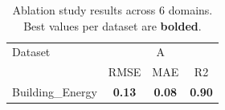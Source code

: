 \begin{table}[t]
\centering
\caption{Ablation study results across 6 domains. Best values per dataset are \textbf{bolded}.}
\label{tab:ablation}
\begin{tabular}{lccc}
\toprule
Dataset & \multicolumn{3}{c}{A} \\
 & RMSE & MAE & R2 \\
\midrule
Building_Energy & \textbf{0.13} & \textbf{0.08} & \textbf{0.90} \\
\bottomrule
\end{tabular}
\end{table}